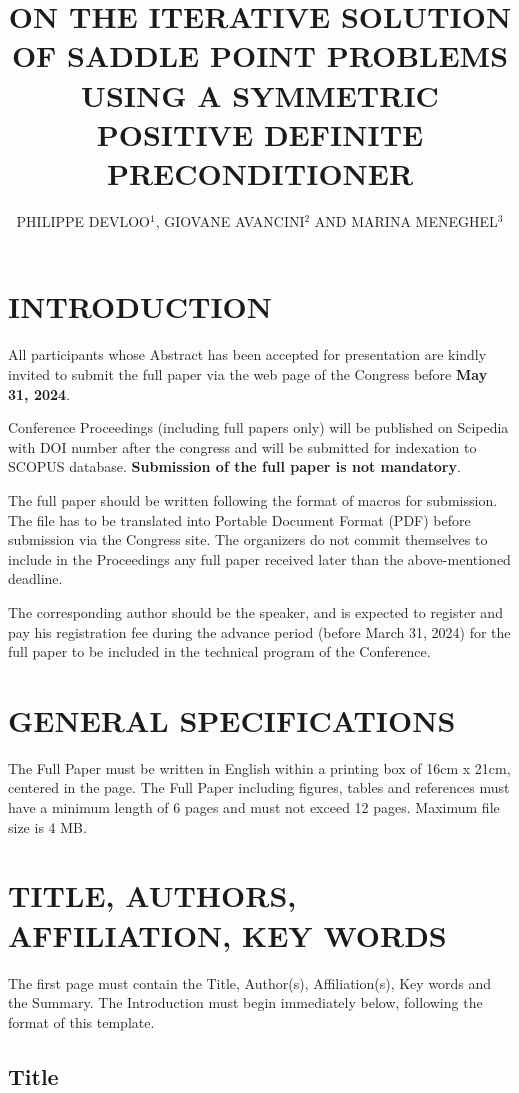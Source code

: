 \documentclass{wccm2024}
\title{ON THE ITERATIVE SOLUTION OF SADDLE POINT PROBLEMS USING A SYMMETRIC POSITIVE DEFINITE PRECONDITIONER}
\author{PHILIPPE DEVLOO$^{1}$, GIOVANE AVANCINI$^{2}$ AND MARINA MENEGHEL$^{3}$}
\begin{document}
\thispagestyle{empty}

\section{INTRODUCTION}

All participants whose Abstract has been accepted for presentation are kindly invited to submit the full paper via the web page of the Congress before \textbf{May 31, 2024}.

Conference Proceedings (including full papers only) will be published on Scipedia with DOI number after the congress and will be submitted for indexation to SCOPUS database. \textbf{Submission of the full paper is not mandatory}.

The full paper should be written following the format of macros for submission. The file has to be translated into Portable Document Format (PDF) before submission via the Congress site. The organizers do not commit themselves to include in the Proceedings any full paper received later than the above-mentioned deadline.

The corresponding author should be the speaker, and is expected to register and pay his registration fee during the advance period (before March 31, 2024) for the full paper to be included in the technical program of the Conference.


\section{GENERAL SPECIFICATIONS}

The Full Paper must be written in English within a printing box of 16cm x 21cm, centered in the page. The Full Paper including figures, tables and references must have a minimum length of 6 pages and must not exceed 12 pages. Maximum file size is 4 MB.

\section{TITLE, AUTHORS, AFFILIATION, KEY WORDS}

The first page must contain the Title, Author(s), Affiliation(s),
Key words and the Summary. The Introduction must begin immediately
below, following the format of this template.

\subsection{Title}
\end{document}
